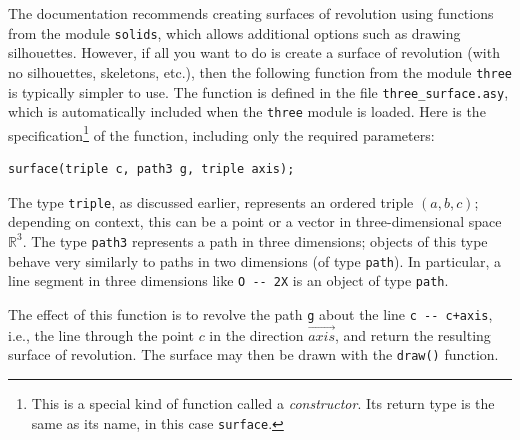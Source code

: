 \documentclass{article}
\begin{document}
The documentation recommends creating surfaces of revolution using functions from the 
module \lstinline!solids!, which allows additional options such as drawing silhouettes.  However, 
if all you want to do is create a surface of revolution (with no silhouettes, skeletons, etc.), then 
the following function from the module \lstinline!three! is typically simpler to use. 
The function is defined in the file \lstinline!three_surface.asy!, which is automatically included 
when the \lstinline!three! module is loaded.  Here is the specification\footnote{This is a special 
kind of function called a \emph{constructor}. Its return type is the same as its name, in this case 
\lstinline!surface!.} of the function, including only the 
required parameters:
\begin{lstlisting}
surface(triple c, path3 g, triple axis);
\end{lstlisting}
The type \lstinline!triple!, as discussed earlier, represents an ordered triple $(a,b,c)$; depending 
on context, this can be a point or a vector in three-dimensional space $\mathbb{R}^3$.  The type 
\lstinline!path3! represents a path in three dimensions; objects of this 
type behave very similarly to paths in two dimensions (of type \lstinline!path!).  In particular, a
line segment in three dimensions like \lstinline!O -- 2X! is an object of type \lstinline!path!.

The effect of this function is to revolve the path \lstinline!g! about the line \lstinline!c -- c+axis!, i.e., 
the line through the point $c$ in the direction $\vec{axis}$,  and return the resulting surface of revolution. 
The surface may then be drawn with the \lstinline!draw()! function.
\end{document}

